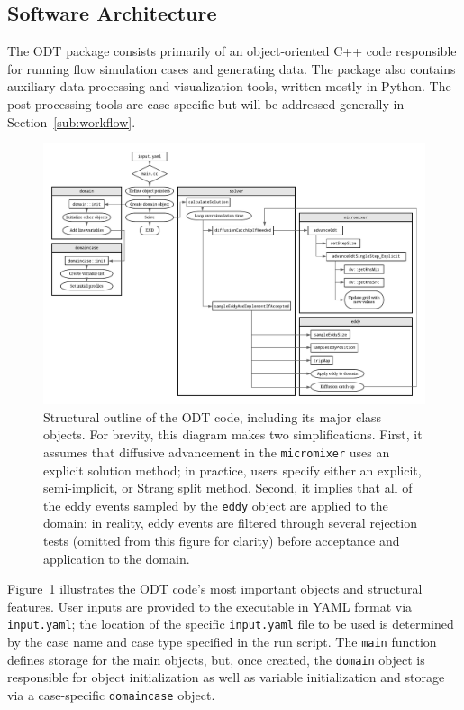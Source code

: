 \documentclass[preprint,12pt, a4paper]{elsarticle}
\begin{document}
\subsection{Software Architecture}
\label{sub:architecture}

The ODT package consists primarily of an object-oriented C++ code responsible for running flow simulation cases and generating data. The package also contains auxiliary data processing and visualization tools, written mostly in Python. The post-processing tools are case-specific but will be  addressed generally in Section~\ref{sub:workflow}. 

\begin{figure}
	\begin{center}
		\includegraphics[width=\textwidth]{../figures/odt_flow_chart.pdf}
	\end{center}
	\caption{Structural outline of the ODT code, including its major class objects. For brevity, this diagram makes two simplifications. First, it assumes that diffusive advancement in the \texttt{micromixer} uses an explicit solution method; in practice, users specify either an explicit, semi-implicit, or Strang split method. Second, it implies that all of the eddy events sampled by the \texttt{eddy} object are applied to the domain; in reality, eddy events are filtered through several rejection tests (omitted from this figure for clarity) before acceptance and application to the domain.}
\label{fig:flowchart}
\end{figure}

Figure~\ref{fig:flowchart} illustrates the ODT code's most important objects and structural features. User inputs are provided to the executable in YAML \cite{Beder_2008} format via \texttt{input.yaml}; the location of the specific \texttt{input.yaml} file to be used is determined by the case name and case type specified in the run script. The \texttt{main} function defines storage for the main objects, but, once created, the \texttt{domain} object is responsible for object initialization as well as variable initialization and storage via a case-specific \texttt{domaincase} object. 
\end{document}
